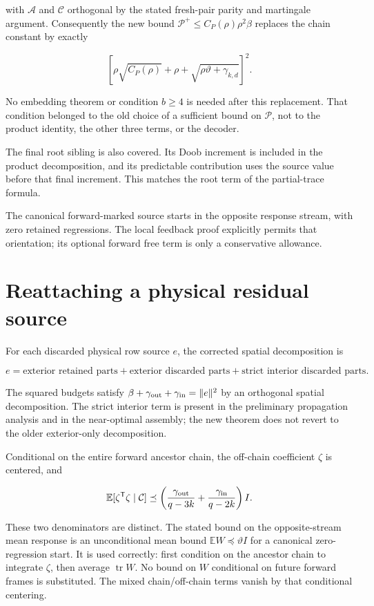 \documentclass[11pt,oneside,openany,a4paper]{book}
\numberwithin{equation}{chapter}
\theoremstyle{definition}
\theoremstyle{remark}
\begin{document}
with \(\mathcal A\) and \(\mathcal C\) orthogonal by the stated fresh-pair parity and martingale argument. Consequently the new bound \(\mathcal P^+\le C_P(\rho)\rho^2\beta\) replaces the chain constant by exactly

\[
\left[\rho\sqrt{C_P(\rho)}
+\rho+\sqrt{\rho\vartheta+\gamma_{k,d}}\right]^2.
\]

No embedding theorem or condition \(b\ge4\) is needed after this replacement. That condition belonged to the old choice of a sufficient bound on \(\mathcal P\), not to the product identity, the other three terms, or the decoder.

The final root sibling is also covered. Its Doob increment is included in the product decomposition, and its predictable contribution uses the source value before that final increment. This matches the root term of the partial-trace formula.

The canonical forward-marked source starts in the opposite response stream, with zero retained regressions. The local feedback proof explicitly permits that orientation; its optional forward free term is only a conservative allowance.

\section{Reattaching a physical residual source}\label{interfaces:reattaching-a-physical-residual-source}

For each discarded physical row source \(e\), the corrected spatial decomposition is

\[
e=\text{exterior retained parts}
+\text{exterior discarded parts}
+\text{strict interior discarded parts}.
\]

The squared budgets satisfy \(\beta+\gamma_{\rm out}+\gamma_{\rm in}=\|e\|^2\) by an orthogonal spatial decomposition. The strict interior term is present in the preliminary propagation analysis and in the near-optimal assembly; the new theorem does not revert to the older exterior-only decomposition.

Conditional on the entire forward ancestor chain, the off-chain coefficient \(\zeta\) is centered, and

\[
\mathbb E[\zeta^{\mathsf T}\zeta\mid\mathcal C]
\preceq\left(\frac{\gamma_{\rm out}}{q-3k}
+\frac{\gamma_{\rm in}}{q-2k}\right)I.
\]

These two denominators are distinct. The stated bound on the opposite-stream mean response is an unconditional mean bound \(\mathbb EW\preceq\vartheta I\) for a canonical zero-regression start. It is used correctly: first condition on the ancestor chain to integrate \(\zeta\), then average \(\operatorname{tr}W\). No bound on \(W\) conditional on future forward frames is substituted. The mixed chain/off-chain terms vanish by that conditional centering.
\end{document}
